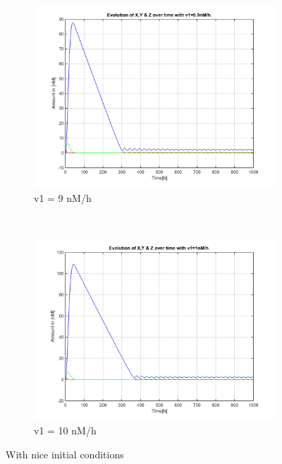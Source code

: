 \documentclass[10pt,a4paper,oneside,twocolumn]{article}
\numberwithin{equation}{section} %
\begin{document}
\begin{figure}
	\begin{subfigure}[b]{0.3\textwidth}
	    \includegraphics[width=\textwidth]{LotsofthesameA/A-A9.png}
	    \caption{v1 = 9 nM/h}
	\end{subfigure}
	~
	\begin{subfigure}[b]{0.3\textwidth}
	    \includegraphics[width=\textwidth]{LotsofthesameA/A-A10.png}
	    \caption{v1 = 10 nM/h}
	\end{subfigure}

	\caption{With nice initial conditions}
    \end{figure}
\end{document}
